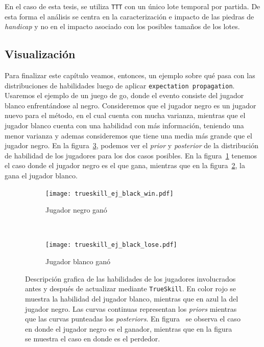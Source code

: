 \documentclass[11pt,twoside,spanish]{report} %
\begin{document}
En el caso de esta tesis, se utiliza \texttt{TTT} con un \'unico lote temporal por partida.
De esta forma el an\'alisis se centra en la caracterizaci\'on e impacto de las piedras de \textit{handicap} y no en el impacto asociado con     los posibles tama\~nos de los lotes.



\subsection{Visualizaci\'on}

Para finalizar este cap\'itulo veamos, entonces, un ejemplo sobre qu\'e pasa con las distribuciones de habilidades luego de aplicar \texttt{expectation propagation}.
Usaremos el ejemplo de un juego de go, donde el evento consiste del jugador blanco enfrent\'andose al negro.
Consideremos que el jugador negro es un jugador nuevo para el m\'etodo, en el cual cuenta con mucha varianza, mientras que el jugador blanco cuenta con una habilidad con m\'as informaci\'on, teniendo una menor varianza y ademas consideremos que tiene una media m\'as grande que el jugador negro.
En la figura~\ref{fig:ejTrue}, podemos ver el \textit{prior} y \textit{posterior} de la distribuci\'on de habilidad de los jugadores para los dos casos posibles.
En la figura~\ref{fig:ejTrueWin} tenemos el caso donde el jugador negro es el que gana, mientras que en la figura~\ref{fig:ejTrueLose}, la gana el jugador blanco.

\begin{figure}[H]
	\centering
	\begin{subfigure}[t]{.49\textwidth}
		\centering
	\texttt{[image: trueskill\_ej\_black\_win.pdf]}
	\caption{Jugador negro gan\'o}
	\label{fig:ejTrueWin}
	\end{subfigure}
 	~
	\begin{subfigure}[t]{.49\textwidth}
		\centering
	\texttt{[image: trueskill\_ej\_black\_lose.pdf]}
	\caption{Jugador blanco gan\'o}
	\label{fig:ejTrueLose}
\end{subfigure}
	\caption{Descripci\'on grafica de las habilidades de los jugadores involucrados antes y despu\'es de actualizar mediante \texttt{TrueSkill}. En color rojo se muestra la habilidad del jugador blanco, mientras que en azul la del jugador negro. Las curvas continuas representan los \textit{priors} mientras que las curvas punteadas los \textit{posteriors}. En figura~ se observa el caso en donde el jugador negro es el ganador, mientras que en la figura~ se muestra el caso en donde es el perdedor.}
\label{fig:ejTrue}
\end{figure}
\end{document}
